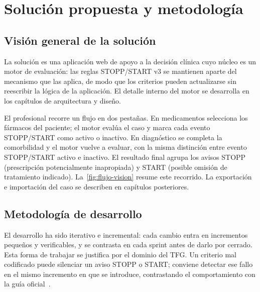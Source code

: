
\chapter{Solución propuesta y metodología}
\label{cap:solucion}

\section{Visión general de la solución}

La solución es una aplicación web de apoyo a la decisión clínica cuyo núcleo
es un motor de evaluación: las reglas STOPP/START v3 se mantienen aparte del
mecanismo que las aplica, de modo que los criterios pueden actualizarse sin
reescribir la lógica de la aplicación. El detalle interno del motor se
desarrolla en los capítulos de arquitectura y diseño.

El profesional recorre un flujo en dos pestañas. En medicamentos selecciona
los fármacos del paciente; el motor evalúa el caso y marca cada evento
STOPP/START como activo o inactivo. En diagnóstico se completa la
comorbilidad y el motor vuelve a evaluar, con la misma distinción entre
evento STOPP/START activo e inactivo.
El resultado final agrupa los avisos STOPP (prescripción potencialmente
inapropiada) y START (posible omisión de tratamiento indicado).
La~\cref{fig:flujo-vision} resume este
recorrido. La exportación e importación del caso se describen en capítulos
posteriores.



\section{Metodología de desarrollo}

El desarrollo ha sido iterativo e incremental: cada cambio entra en
incrementos pequeños y verificables, y se contrasta en cada sprint
antes de darlo por cerrado. Esta forma de trabajar se justifica por el
dominio del TFG. Un criterio mal codificado puede silenciar un aviso STOPP
o START; conviene detectar ese fallo en el mismo incremento en que se
introduce, contrastando el comportamiento con la guía
oficial~\cite{omahony2023stopp,sacyl2023stopp}.

